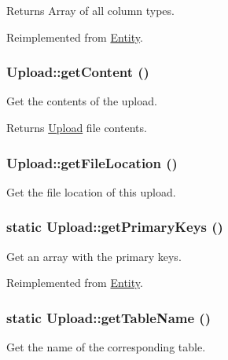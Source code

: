 \begin{DoxyReturn}{Returns}
Array of all column types. 
\end{DoxyReturn}


Reimplemented from \hyperlink{classEntity_ad69437219c10955803707fbf6ac458e7}{Entity}.

\hypertarget{classUpload_a8e8a7b44008c246f9cb524d20848d6c1}{
\subsubsection[{getContent}]{\setlength{\rightskip}{0pt plus 5cm}Upload::getContent ()}}
\label{classUpload_a8e8a7b44008c246f9cb524d20848d6c1}
Get the contents of the upload.

\begin{DoxyReturn}{Returns}
\hyperlink{classUpload}{Upload} file contents. 
\end{DoxyReturn}
\hypertarget{classUpload_aae7c62490598d9dafc488bb9551920b6}{
\subsubsection[{getFileLocation}]{\setlength{\rightskip}{0pt plus 5cm}Upload::getFileLocation ()}}
\label{classUpload_aae7c62490598d9dafc488bb9551920b6}
Get the file location of this upload. \hypertarget{classUpload_af0e0a173941a75ed21e7d51d86c7d0c4}{
\subsubsection[{getPrimaryKeys}]{\setlength{\rightskip}{0pt plus 5cm}static Upload::getPrimaryKeys ()}}
\label{classUpload_af0e0a173941a75ed21e7d51d86c7d0c4}
Get an array with the primary keys. 

Reimplemented from \hyperlink{classEntity_a61bbfbb4058427174e002a09ddc77c41}{Entity}.

\hypertarget{classUpload_a9c147629f26a6d0c7b32136eba761869}{
\subsubsection[{getTableName}]{\setlength{\rightskip}{0pt plus 5cm}static Upload::getTableName ()}}
\label{classUpload_a9c147629f26a6d0c7b32136eba761869}
Get the name of the corresponding table. 

